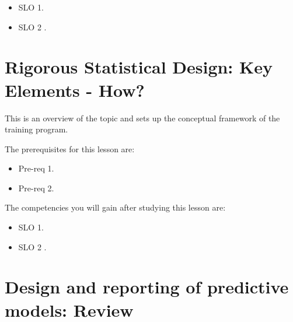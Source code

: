 \begin{itemize}
    \item SLO 1.
\end{itemize}

\begin{itemize}
    \item SLO 2 .
\end{itemize}

\section{Rigorous Statistical Design: Key Elements - How?}
\label{sec:rigorous-statistical-design-key-elements-how}

This is an overview of the topic and sets up the conceptual framework of the training program.




The prerequisites for this lesson are: 




\begin{itemize}
    \item Pre-req 1.
\end{itemize}

\begin{itemize}
    \item Pre-req 2.
\end{itemize}




The competencies you will gain after studying this lesson are: 




\begin{itemize}
    \item SLO 1.
\end{itemize}

\begin{itemize}
    \item SLO 2 .
\end{itemize}

\section{Design and reporting of predictive models: Review}
\label{sec:design-and-reporting-of-predictive-models-review}

